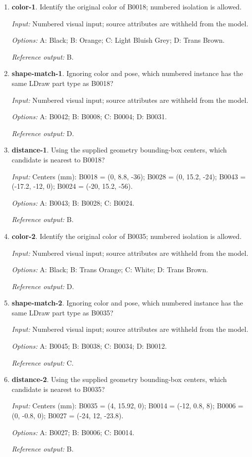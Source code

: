 \begin{enumerate}
\item \textbf{color-1}. Identify the original color of B0018; numbered isolation is allowed.\par {\small \textit{Input:} Numbered visual input; source attributes are withheld from the model. \par\textit{Options:} A: Black; B: Orange; C: Light Bluish Grey; D: Trans Brown. \par\textit{Reference output:} B.}
\item \textbf{shape-match-1}. Ignoring color and pose, which numbered instance has the same LDraw part type as B0018?\par {\small \textit{Input:} Numbered visual input; source attributes are withheld from the model. \par\textit{Options:} A: B0042; B: B0008; C: B0004; D: B0031. \par\textit{Reference output:} D.}
\item \textbf{distance-1}. Using the supplied geometry bounding-box centers, which candidate is nearest to B0018?\par {\small \textit{Input:} Centers (mm): B0018 = (0, 8.8, -36); B0028 = (0, 15.2, -24); B0043 = (-17.2, -12, 0); B0024 = (-20, 15.2, -56). \par\textit{Options:} A: B0043; B: B0028; C: B0024. \par\textit{Reference output:} B.}
\item \textbf{color-2}. Identify the original color of B0035; numbered isolation is allowed.\par {\small \textit{Input:} Numbered visual input; source attributes are withheld from the model. \par\textit{Options:} A: Black; B: Trans Orange; C: White; D: Trans Brown. \par\textit{Reference output:} D.}
\item \textbf{shape-match-2}. Ignoring color and pose, which numbered instance has the same LDraw part type as B0035?\par {\small \textit{Input:} Numbered visual input; source attributes are withheld from the model. \par\textit{Options:} A: B0045; B: B0038; C: B0034; D: B0012. \par\textit{Reference output:} C.}
\item \textbf{distance-2}. Using the supplied geometry bounding-box centers, which candidate is nearest to B0035?\par {\small \textit{Input:} Centers (mm): B0035 = (4, 15.92, 0); B0014 = (-12, 0.8, 8); B0006 = (0, -0.8, 0); B0027 = (-24, 12, -23.8). \par\textit{Options:} A: B0027; B: B0006; C: B0014. \par\textit{Reference output:} B.}

\end{enumerate}
